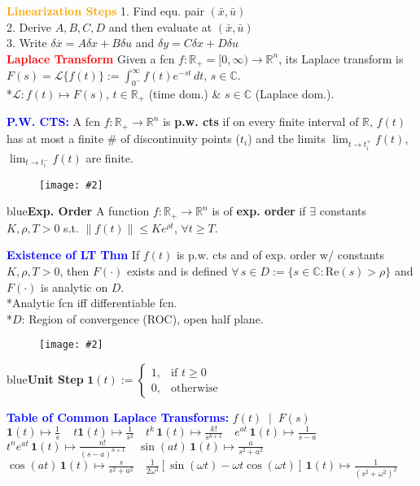 \documentclass[5pt]{extarticle} %
\newcommand{\customFigure}[3][]{%
    \vspace{-1.5em}
    \begin{figure}[H]
        \centering
        \texttt{[image: \#2]}
    \end{figure}
    \vspace{-1.5em}
}
\begin{document}
\begin{paracol}{3}
{    \textcolor{orange}{\textbf{Linearization Steps}} 1. Find equ. pair $(\bar{x}, \bar{u})$ \\
    2. Derive $A,B,C,D$ and then evaluate at $(\bar{x}, \bar{u})$ \\
    3. Write $\delta \overset{\cdot}{x} = A \delta x + B \delta u$ and $\delta y = C \delta x + D \delta u$ \\

    \textcolor{red}{\textbf{Laplace Transform}} Given a fcn $f: \mathbb{R}_+ = [0,\infty) \to \mathbb{R}^n$, its Laplace transform is 
    $F(s) = \mathcal{L} \{ f(t) \} := \int_{0^-}^{\infty} f(t) e^{-st} \, dt$, $s \in \mathbb{C}$. \\ 
    *$\mathcal{L:} f(t) \mapsto F(s)$, $t \in \mathbb{R}_+$ (time dom.) \& $s \in \mathbb{C}$ (Laplace dom.).
    
    \textcolor{blue}{\textbf{P.W. CTS:}} A fcn $f: \mathbb{R}_+ \to \mathbb{R}^n$ is \textbf{p.w. cts} if on every finite interval of $\mathbb{R}$, $f(t)$ has at most a finite \# of discontinuity points ($t_i$) and the limits 
    $\lim_{t \to t_i^+} f(t)$, $\lim_{t \to t_i^-} f(t)$ are finite.

    \customFigure[0.1]{../Images/L4_0.png}

    \textcolor{blue}{\textbf{Exp. Order}} A function $f: \mathbb{R}_+ \to \mathbb{R}^n$ is of \textbf{exp. order} if $\exists$ constants $K, \rho, T > 0$ s.t. $\|f(t)\| \leq K e^{\rho t}$, $\forall t \geq T$.

    \textcolor{blue}{\textbf{Existence of LT Thm}} If $f(t)$ is p.w. cts and of exp. order w/ constants $K, \rho, T > 0$, then $F(\cdot)$ exists and is defined $\forall \, s \in D := \{s \in \mathbb{C} : \text{Re}(s) > \rho\}$ and $F(\cdot)$ is analytic on $D$. \\
    *Analytic fcn iff differentiable fcn. \\
    *$D$: Region of convergence (ROC), open half plane. \\
    \customFigure[0.1]{../Images/L4_1.png}

    \textcolor{blue}{\textbf{Unit Step}} $\mathbf{1}(t) := 
        \begin{cases} 
        1, & \text{if } t \geq 0 \\ 
        0, & \text{otherwise}
        \end{cases}$

    \textcolor{blue}{\textbf{Table of Common Laplace Transforms:}} $f(t) \; \mid \; F(s)$ \\ 
    $\mathbf{1}(t) \mapsto \frac{1}{s} \, \quad t \mathbf{1}(t) \mapsto \frac{1}{s^2} \quad t^k \, \mathbf{1}(t) \mapsto \frac{k!}{s^{k+1}} \quad e^{at} \, \mathbf{1}(t) \mapsto \frac{1}{s-a}$ \\ 
    $t^n e^{at} \, \mathbf{1}(t) \mapsto \frac{n!}{(s-a)^{n+1}} \quad \sin(at) \, \mathbf{1}(t) \mapsto \frac{a}{s^2 + a^2} \quad $ \\
    $ \cos(at) \, \mathbf{1}(t) \mapsto \frac{s}{s^2 + a^2} \quad \frac{1}{2\omega^3} [\sin(\omega t) - \omega t \cos(\omega t)] \, \mathbf{1}(t) \mapsto \frac{1}{(s^2 + \omega^2)^2}$ \\

}
\end{paracol}
\end{document}
